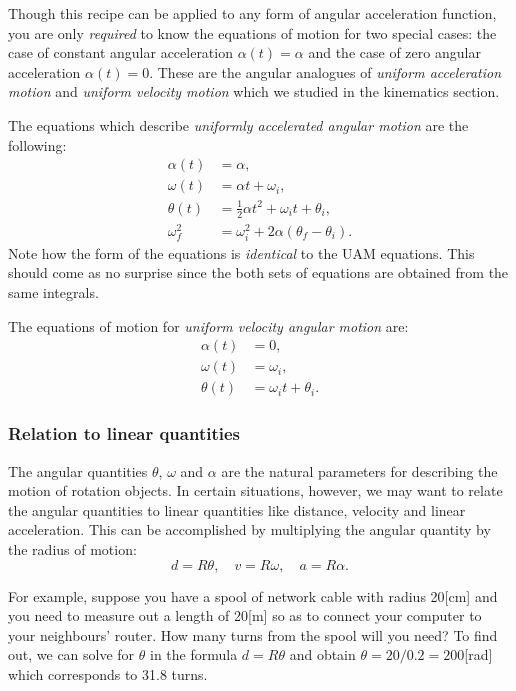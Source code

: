 \documentclass[letterpaper,9pt,journal]{IEEEtran}
\newcommand{\dokuitalic}[1]{\textsl{#1}}
\begin{document}
Though this recipe can be applied to any form of angular acceleration function, 
you are only \dokuitalic{required} to know the equations of motion for two special cases:
the case of constant angular acceleration $\alpha(t)=\alpha$ and the
case of zero angular acceleration $\alpha(t)=0$.
These are the angular analogues of \dokuitalic{uniform acceleration motion} and \dokuitalic{uniform velocity motion}
which we studied in the kinematics section.

The equations which describe \dokuitalic{uniformly accelerated angular motion} are the following:
\begin{align*}
  \alpha(t) &= \alpha, 						\\
  \omega(t) &= \alpha t + \omega_i, 				\\
  \theta(t) &= \frac{1}{2}\alpha t^2 + \omega_it + \theta_i, 	\\
 \omega_f^2 &= \omega_i^2 + 2\alpha(\theta_f - \theta_i).
\end{align*}
Note how the form of the equations is \dokuitalic{identical} to the UAM equations.
This should come as no surprise since the both sets of equations are
obtained from the same integrals.

The equations of motion for \dokuitalic{uniform velocity angular motion} are:
\begin{align*}
  \alpha(t) &= 0, 			\\
  \omega(t) &= \omega_i, 		\\
  \theta(t) &= \omega_it + \theta_i.
\end{align*}



\subsubsection{Relation to linear quantities}

The angular quantities $\theta$, $\omega$ and $\alpha$ are the
natural parameters for describing the motion of rotation objects.
In certain situations, however, we may want to relate the angular 
quantities to linear quantities like distance, velocity and linear acceleration.
This can be accomplished by multiplying the angular quantity by the radius of motion:
\[
  d = R\theta, \quad v = R\omega, \quad a = R\alpha.
\]

For example, suppose you have a spool of network cable with radius 20[cm]
and you need to measure out a length of 20[m] so as to connect your computer
to your neighbours' router. How many turns from the spool will you need?
To find out, we can solve for $\theta$ in the formula $d=R\theta$
and obtain $\theta = 20/0.2=200$[rad] which corresponds to 31.8 turns.
\end{document}
